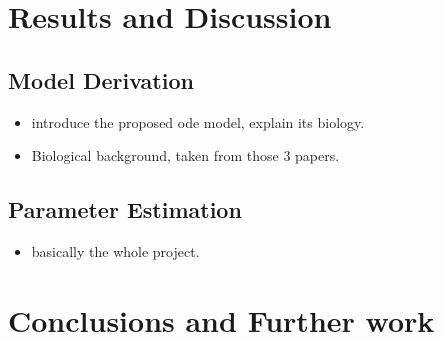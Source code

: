 \documentclass[10pt,journal]{./IEEE_latex_class/IEEEtran}
\begin{document}
 
 






\section{Results and Discussion}
\label{Results and Discussion}



\subsection{Model Derivation}

 \begin{itemize}
 \item introduce the proposed ode model, explain its biology.
 \item Biological background, taken from those 3 papers.
 \end{itemize}


\subsection{Parameter Estimation}
 \begin{itemize}
\item basically the whole project.
\cite{Isaacs2006}
 \end{itemize}
 
\section{Conclusions and Further work}
\label{Conclusions and Further work}




\end{document}
